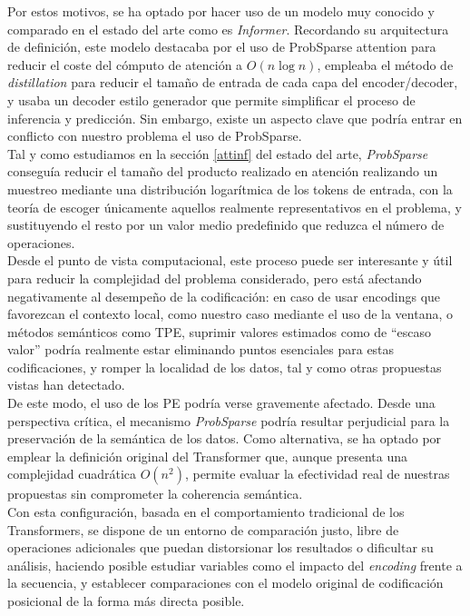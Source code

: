 Por estos motivos, se ha optado por hacer uso de un modelo muy conocido y comparado en el estado del arte como es \textit{Informer}. Recordando su arquitectura de definición, este modelo destacaba por el uso de ProbSparse attention para reducir el coste del cómputo de atención a $O(n \log{n})$, empleaba el método de \textit{distillation} para reducir el tamaño de entrada de cada capa del encoder/decoder, y usaba un decoder estilo generador que permite simplificar el proceso de inferencia y predicción. Sin embargo, existe un aspecto clave que podría entrar en conflicto con nuestro problema el uso de ProbSparse.\\

Tal y como estudiamos en la sección \ref{attinf} del estado del arte, \textit{ProbSparse} conseguía reducir el tamaño del producto realizado en atención realizando un muestreo mediante una distribución logarítmica de los tokens de entrada, con la teoría de escoger únicamente aquellos realmente representativos en el problema, y sustituyendo el resto por un valor medio predefinido que reduzca el número de operaciones.\\
	
Desde el punto de vista computacional, este proceso puede ser interesante y útil para reducir la complejidad del problema considerado, pero está afectando negativamente al desempeño de la codificación: en caso de usar encodings que favorezcan el contexto local, como nuestro caso mediante el uso de la ventana, o métodos semánticos como TPE, suprimir valores estimados como de ``escaso valor'' podría realmente estar eliminando puntos esenciales para estas codificaciones, y romper la localidad de los datos, tal y como otras propuestas vistas han detectado.\\

De este modo, el uso de los PE podría verse gravemente afectado. Desde una perspectiva crítica, el mecanismo \textit{ProbSparse} podría resultar perjudicial para la preservación de la semántica de los datos. Como alternativa, se ha optado por emplear la definición original del Transformer que, aunque presenta una complejidad cuadrática $O(n^2)$, permite evaluar la efectividad real de nuestras propuestas sin comprometer la coherencia semántica.\\

Con esta configuración, basada en el comportamiento tradicional de los Transformers, se dispone de un entorno de comparación justo, libre de operaciones adicionales que puedan distorsionar los resultados o dificultar su análisis, haciendo posible estudiar variables como el impacto del \textit{encoding} frente a la secuencia, y establecer comparaciones con el modelo original de codificación posicional de la forma más directa posible.

